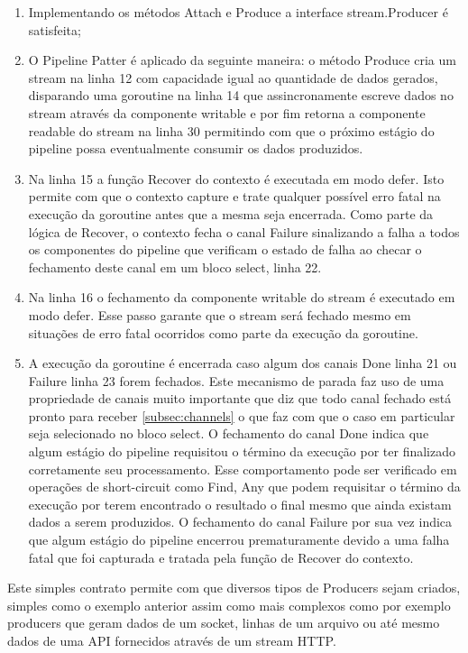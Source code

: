 \begin{enumerate}
\item Implementando os métodos Attach e Produce a interface stream.Producer é satisfeita;
\item O Pipeline Patter é aplicado da seguinte maneira: o método Produce cria um stream na linha 12 com capacidade igual ao quantidade de dados gerados, disparando uma goroutine na linha 14 que assincronamente escreve dados no stream através da componente writable e por fim retorna a componente readable do stream na linha 30 permitindo com que o próximo estágio do pipeline possa eventualmente consumir os dados produzidos.
\item Na linha 15 a função Recover do contexto é executada em modo defer. Isto permite com que o contexto capture e trate qualquer possível erro fatal na execução da goroutine antes que a mesma seja encerrada. Como parte da lógica de Recover, o contexto fecha o canal Failure sinalizando a falha a todos os componentes do pipeline que verificam o estado de falha ao checar o fechamento deste canal em um bloco select, linha 22.
\item Na linha 16 o fechamento da componente writable do stream é executado em modo defer. Esse passo garante que o stream será fechado mesmo em situações de erro fatal ocorridos como parte da execução da goroutine.
\item A execução da goroutine é encerrada caso algum dos canais Done linha 21 ou Failure linha 23 forem fechados. Este mecanismo de parada faz uso de uma propriedade de canais muito importante que diz que todo canal fechado está pronto para receber \ref{subsec:channels} o que faz com que o caso em particular seja selecionado no bloco select. O fechamento do canal Done indica que algum estágio do pipeline requisitou o término da execução por ter finalizado corretamente seu processamento. Esse comportamento pode ser verificado em operações de short-circuit como Find, Any que podem requisitar o término da execução por terem encontrado o resultado o final mesmo que ainda existam dados a serem produzidos. O fechamento do canal Failure por sua vez indica que algum estágio do pipeline encerrou prematuramente devido a uma falha fatal que foi capturada e tratada pela função de Recover do contexto.
\end{enumerate}

Este simples contrato permite com que diversos tipos de Producers sejam criados, simples como o exemplo anterior assim como mais complexos como por exemplo producers que geram dados de um socket, linhas de um arquivo ou até mesmo dados de uma API fornecidos através de um stream HTTP.

